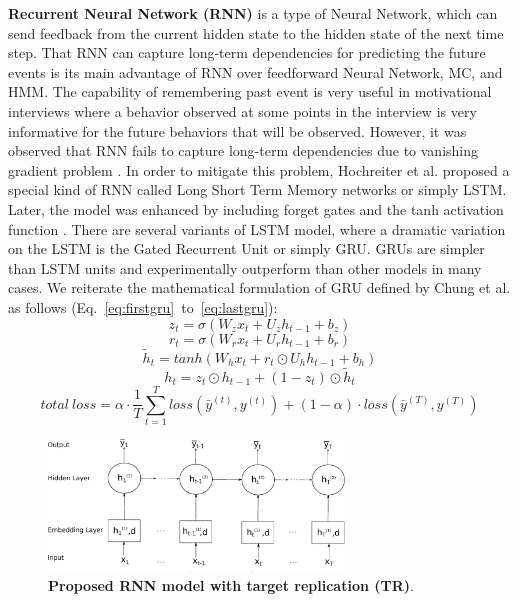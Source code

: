 \documentclass{amia_summit_2018}
\begin{document}
\textbf {Recurrent Neural Network (RNN)} is a type of Neural Network, which can send feedback from the current hidden state to the hidden state of the next time step. That RNN can capture long-term dependencies for predicting the future events is its main advantage of RNN over feedforward Neural Network, MC, and HMM. The capability of remembering past event is very useful in motivational interviews where a behavior observed at some points in the interview is very informative for the future behaviors that will be observed. However, it was observed that RNN fails to capture long-term dependencies due to vanishing gradient problem \cite{bengio1993problem}. In order to mitigate this problem, Hochreiter et al.\cite{hochreiter1997long} proposed a special kind of RNN called Long Short Term Memory networks or simply LSTM. Later, the model was enhanced by including forget gates and the tanh activation function \cite{graves2013speech}. There are several variants of LSTM model, where a dramatic variation on the LSTM is the Gated Recurrent Unit\cite{cho2014properties} or simply GRU. GRUs are simpler than LSTM units and experimentally outperform than other models in many cases. We reiterate the mathematical formulation of GRU defined by Chung et al.\cite{chung2014empirical} as follows (Eq.~\ref{eq:firstgru}~to~\ref{eq:lastgru}):
\begin{equation}
z_t = \sigma(W_zx_t + U_zh_{t-1} + b_z)
\label{eq:firstgru}
\end{equation}
\begin{equation}
r_t = \sigma(W_rx_t + U_rh_{t-1} + b_r)
\end{equation}
\begin{equation}
\tilde h_t = tanh(W_hx_t + r_t \odot U_hh_{t-1} + b_h) 
\end{equation}
\begin{equation}
h_t = z_t \odot h_{t-1} + (1-z_t) \odot \tilde h_t
\label{eq:lastgru}
\end{equation}  
\begin{equation}
total\ loss = \alpha \cdot \frac{1}{T}\sum_{t=1}^T loss(\bar y^{(t)},y^{(t)}) + (1 - \alpha) \cdot loss(\bar y^{(T)},y^{(T)})
\label{eq:loss}
\end{equation}  
\begin{figure}[!htb]
    \centering
    \includegraphics[width=0.70\textwidth]{figures/rnn.eps}
    \caption{\textbf{Proposed RNN model with target replication (TR)}.}
    \label{fig:rnn-model}
\end{figure}
\end{document}
